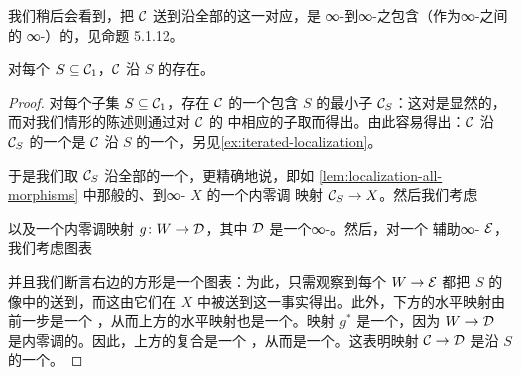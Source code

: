 \begin{remark}\label{rem:localization-left-adjoint}
我们稍后会看到，把 $\mathcal{C}$ 送到沿全部\trMorphism{}的\trLocalization{}这一对应，是
∞-\trGroupoid{}到∞-\trCategories{}之包含（作为∞-\trCategories{}之间的
∞-\trFunctor{}）的\trLeftAdjoint{}，见命题 5.1.12。
\end{remark}

\begin{proposition}\label{prop:localization-along-s}
对每个 $S \subseteq \mathcal{C}_1$，$\mathcal{C}$ 沿 $S$ 的\trLocalization{}存在。
\end{proposition}

\begin{proof}
对每个子集 $S \subseteq \mathcal{C}_1$，存在 $\mathcal{C}$ 的一个包含 $S$ 的最小子\trCategory{}%
$\mathcal{C}_S$：这对\trCategories{}是显然的，而对我们情形的陈述则通过对 $\mathcal{C}$ 的%
\trHomotopyCategory{}中相应的子\trCategory{}取\trPullback{}而得出。由此容易得出：$\mathcal{C}$ 沿 $\mathcal{C}_S$
的一个\trLocalization{}是 $\mathcal{C}$ 沿 $S$ 的一个\trLocalization{}，另见\cref{ex:iterated-localization}。

于是我们取 $\mathcal{C}_S$ 沿全部\trMorphism{}的一个\trLocalization{}，更精确地说，即如%
\cref{lem:localization-all-morphisms} 中那般的、到∞-\trGroupoid{} $X$ 的一个内零调
映射 $\mathcal{C}_S \to X$。然后我们考虑\trPushout{}%
\begin{center}
\end{center}
以及一个内零调映射 $g\colon W \to \mathcal{D}$，其中 $\mathcal{D}$ 是一个∞-\trCategory{}。然后，对一个
辅助∞-\trCategory{} $\mathcal{E}$，我们考虑图表
\begin{center}
\end{center}
并且我们断言右边的方形是一个\trPullback{}图表：为此，只需观察到每个\trFunctor{}%
$W \to \mathcal{E}$ 都把 $S$ 的像中的\trMorphism{}送到\trEquivalence{}，而这由它们在
$X$ 中被送到\trEquivalence{}这一事实得出。此外，下方的水平映射由前一步是一个%
\trTrivialFibration{}，从而上方的水平映射也是一个\trTrivialFibration{}。映射 $g^*$
是一个\trTrivialFibration{}，因为 $W \to \mathcal{D}$ 是内零调的。因此，上方的复合是一个%
\trTrivialFibration{}，从而是一个\trJoyalEquivalence{}。这表明映射 $\mathcal{C} \to \mathcal{D}$ 是沿
$S$ 的一个\trLocalization{}。
\end{proof}


